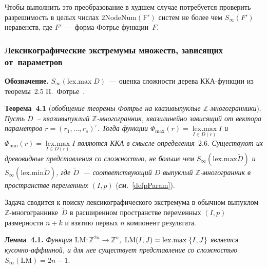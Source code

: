 \begin{multicols}{2}
Чтобы выполнить это преобразование в худшем случае потребуется
проверить разрешимость в целых числах $2\mathrm{NodeNum(F')}$ систем
не более чем $S_\infty(F')$ неравенств, где $F'$~--- форма Фотрье
функции~$F$.


\subsubsection{Лексикографические экстремумы множеств, зависящих от~параметров} %

\noindent
\textbf{Обозначение.} $S_\infty(\mathrm{lex.max}\; D)$~--- оценка сложности дерева 
ККА-функции из теоремы~2.5 П.~Фотрье~\cite{Feautrier2}.

\medskip

\noindent
\textbf{Теорема~4.1}
(\textit{обобщение теоремы Фотрье на квазивыпуклые
$\mathbb{Z}$-много\-гран\-ники}). \textit{Пусть $D$~-- квазивыпуклый
$\mathbb{Z}$-многогранник, квазилинейно зависящий от вектора
параметров $r=(r_1,\ldots,r_s)^\tau$. Тогда функции
$\Phi_{\max}(r)=\mathop{\mathrm{lex.max}}\limits_{I\in D(r)}I$ и
$\Phi_{\min}(r)=\mathop{\mathrm{lex.max}}\limits_{I\in D(r)} I$ являются
ККА в смысле определения}~2.6.
\textit{Существуют их древовидные представления со сложностью, не больше чем
$S_\infty(\mathrm{lex.max} \widetilde D)$ и
$S_\infty(\mathrm{lex.min} \widetilde D)$, где $\widetilde D$~---
соответствующий $D$ выпуклый $\mathbb{Z}$-многогранник в
пространстве переменных $(I,p)$} (\textit{см.}~\eqref{defpParam}). 

\medskip

Задача сводится к поиску лексикографического экстремума в обычном
выпуклом $\mathbb{Z}$-мно\-го\-гран\-ни\-ке~$\widetilde D$ в расширенном
пространстве переменных $(I,p)$ размерности $n+k$ и взятию первых
$n$ компонент результата.

\smallskip

\noindent
\textbf{Лемма~4.1.}
\textit{Функция $\mathrm{LM}:\mathbb{Z}^{2n}\to\mathbb{Z}^{n}$,
$\mathrm{LM}(I,J)\hm=\mathrm{lex.max}\;\{I,J\}$ является кусочно-аффинной, и для
нее существует представление со сложностью} $S_\infty(\mathrm{LM})=2n-1$.

\medskip



\end{multicols}
